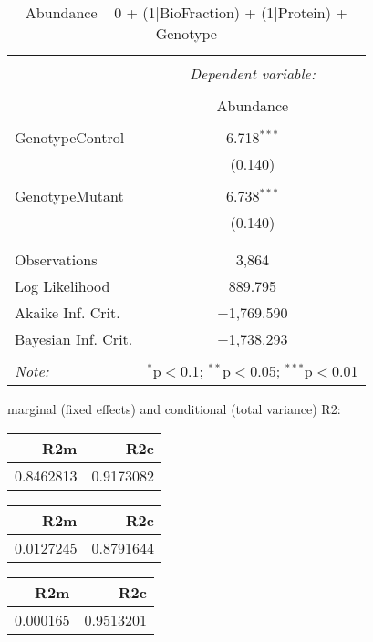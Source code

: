 \documentclass[11pt]{report}
\begin{document}
\begin{table}[!htbp] \centering 
  \caption{Abundance ~ 0 + (1|BioFraction) + (1|Protein) + Genotype} 
  \label{} 
\begin{tabular}{@{\extracolsep{5pt}}lc} 
\\[-1.8ex]\hline 
\hline \\[-1.8ex] 
 & \multicolumn{1}{c}{\textit{Dependent variable:}} \\ 
\cline{2-2} 
\\[-1.8ex] & Abundance \\ 
\hline \\[-1.8ex] 
 GenotypeControl & 6.718$^{***}$ \\ 
  & (0.140) \\ 
  & \\ 
 GenotypeMutant & 6.738$^{***}$ \\ 
  & (0.140) \\ 
  & \\ 
\hline \\[-1.8ex] 
Observations & 3,864 \\ 
Log Likelihood & 889.795 \\ 
Akaike Inf. Crit. & $-$1,769.590 \\ 
Bayesian Inf. Crit. & $-$1,738.293 \\ 
\hline 
\hline \\[-1.8ex] 
\textit{Note:}  & \multicolumn{1}{r}{$^{*}$p$<$0.1; $^{**}$p$<$0.05; $^{***}$p$<$0.01} \\ 
\end{tabular} 
\end{table} 
marginal (fixed effects) and conditional (total variance) R2:

\begin{tabular}{r|r}
\hline
R2m & R2c\\
\hline
0.8462813 & 0.9173082\\
\hline
\end{tabular}

\begin{tabular}{r|r}
\hline
R2m & R2c\\
\hline
0.0127245 & 0.8791644\\
\hline
\end{tabular}

\begin{tabular}{r|r}
\hline
R2m & R2c\\
\hline
0.000165 & 0.9513201\\
\hline
\end{tabular}
\end{document}

